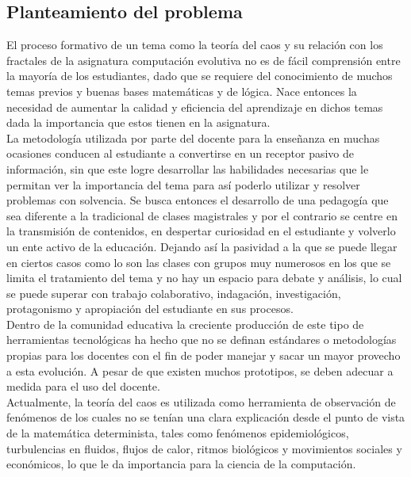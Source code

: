 \documentclass[letterpaper, 11pt, oneside]{article}
\theoremstyle{definition}
\theoremstyle{remark}
\begin{document}
\clearpage
\subsection{Planteamiento del problema}
El proceso formativo de un tema como la teoría del caos y su relación con los fractales de la asignatura computación evolutiva no es de fácil comprensión entre la mayoría de los estudiantes, dado que se requiere del conocimiento de muchos temas previos y buenas bases matemáticas y de lógica. Nace entonces la necesidad de aumentar la calidad y eficiencia del aprendizaje en dichos temas dada la importancia que estos tienen en la asignatura. \\

La metodología utilizada por parte del docente para la enseñanza en muchas ocasiones conducen al estudiante a convertirse en un receptor pasivo de información, sin que este logre desarrollar las habilidades necesarias que le permitan ver la importancia del tema para así poderlo utilizar y resolver problemas con solvencia. Se busca entonces el desarrollo de una pedagogía que sea diferente a la tradicional de clases magistrales y por el contrario se centre en la transmisión de contenidos, en despertar curiosidad en el estudiante y volverlo un ente activo de la educación. Dejando así la pasividad a la que se puede llegar en ciertos casos como lo son las clases con grupos muy numerosos en los que se limita el tratamiento del tema y no hay un espacio para debate y análisis, lo cual se puede superar con trabajo colaborativo, indagación, investigación, protagonismo y apropiación del estudiante en sus procesos. \\

Dentro de la comunidad educativa la creciente producción de este tipo de herramientas tecnológicas ha hecho que no se definan estándares o metodologías propias para los docentes con el fin de poder manejar y sacar un mayor provecho a esta evolución. A pesar de que existen muchos prototipos, se deben adecuar a medida para el uso del docente. \\

Actualmente, la teoría del caos es utilizada como herramienta de observación de fenómenos de los cuales no se tenían una clara explicación desde el punto de vista de la matemática determinista, tales como fenómenos epidemiológicos, turbulencias en fluidos, flujos de calor, ritmos biológicos y movimientos sociales y económicos, lo que le da importancia para la ciencia de la computación. \\
\end{document}
